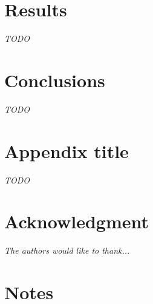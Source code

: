 \documentclass[journal,onecolumn]{IEEEtran}
\begin{document}
%
%
%
\section{Results}

\textit{TODO}


%
%
%
\section{Conclusions}

\textit{TODO}


\appendices
\section{Appendix title}
\textit{TODO}


%
%
%
\section*{Acknowledgment}

\textit{The authors would like to thank...}

\section*{Notes}
\end{document}
